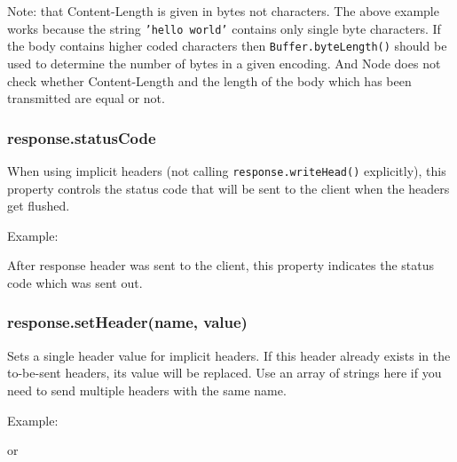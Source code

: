 Note: that Content-Length is given in bytes not characters. The above
example works because the string \texttt{'hello world'} contains only
single byte characters. If the body contains higher coded characters
then \texttt{Buffer.byteLength()} should be used to determine the number
of bytes in a given encoding. And Node does not check whether
Content-Length and the length of the body which has been transmitted are
equal or not.

\subsubsection{response.statusCode}

When using implicit headers (not calling \texttt{response.writeHead()}
explicitly), this property controls the status code that will be sent to
the client when the headers get flushed.

Example:

\begin{Shaded}
\begin{Highlighting}[]
 \NormalTok{= }\NormalTok{;}
\end{Highlighting}
\end{Shaded}

After response header was sent to the client, this property indicates
the status code which was sent out.

\subsubsection{response.setHeader(name, value)}

Sets a single header value for implicit headers. If this header already
exists in the to-be-sent headers, its value will be replaced. Use an
array of strings here if you need to send multiple headers with the same
name.

Example:

\begin{Shaded}
\begin{Highlighting}[]
\NormalTok{(}\NormalTok{, }\NormalTok{);}
\end{Highlighting}
\end{Shaded}

or

\begin{Shaded}
\begin{Highlighting}[]
\NormalTok{(}\NormalTok{, [}\NormalTok{, }\NormalTok{]);}
\end{Highlighting}
\end{Shaded}

